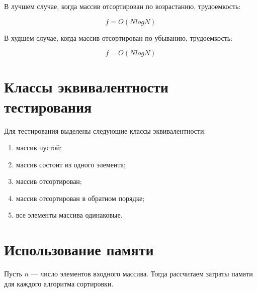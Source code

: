 В лучшем случае, когда массив отсортирован по возрастанию, трудоемкость:

\begin{equation}
	f = O(NlogN)
\end{equation}

В худшем случае, когда массив отсортирован по убыванию, трудоемкость:

\begin{equation}
	f = O(NlogN)
\end{equation}

\section{Классы эквивалентности тестирования}

Для тестирования выделены следующие классы эквивалентности:
\begin{enumerate}
	\item массив пустой;
	\item массив состоит из одного элемента;
	\item массив отсортирован;
	\item массив отсортирован в обратном порядке;
	\item все элементы массива одинаковые.
\end{enumerate}

\section{Использование памяти}

Пусть $n$ --- число элементов входного массива. Тогда рассчитаем затраты памяти для каждого алгоритма сортировки.


